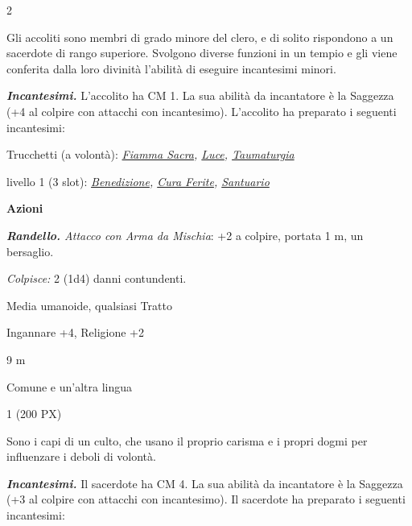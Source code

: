\begin{multicols}{2}
{Gli accoliti sono membri di grado minore del clero, e di solito rispondono a un sacerdote di rango superiore. Svolgono diverse funzioni in un tempio e gli viene conferita dalla loro divinità l'abilità di eseguire incantesimi minori.

\emph{\textbf{Incantesimi.}} L'accolito ha CM 1. La sua abilità da incantatore è la Saggezza (+4 al colpire con attacchi con incantesimo). L'accolito ha preparato i seguenti incantesimi:

Trucchetti (a volontà): \emph{\hyperlink{Fiamma Sacra}{Fiamma Sacra}, \hyperlink{Luce}{Luce}, \hyperlink{Taumaturgia}{Taumaturgia}}

livello 1 (3 slot): \emph{\hyperlink{Benedizione}{Benedizione}, \hyperlink{Cura Ferite}{Cura Ferite}, \hyperlink{Santuario}{Santuario}}

\medskip\textbf{Azioni}

\emph{\textbf{Randello.} Attacco con Arma da Mischia}: +2 a colpire, portata 1 m, un bersaglio.

\emph{Colpisce:} 2 (1d4) danni contundenti.

\begin{description}[noitemsep, topsep=0pt, parsep=0pt, partopsep=0pt, itemsep=1pt, leftmargin=2.35cm,  labelwidth=2.2cm, itemindent=0cm, listparindent=0pt] %
\setlength{\baselineskip}{10pt}
\item[\textbf{Taglia/Tipo}] Media umanoide, qualsiasi Tratto
\item[\textbf{Caratt.}] 
\item[\textbf{Punti Ferita}] 
\item[\textbf{Comp.}] Ingannare +4, Religione +2
\item[\textbf{Tiri Salvez.}] 
\item[\textbf{Movimento}] 9 m
\item[\textbf{Linguaggi}] Comune e un'altra lingua
\item[\textbf{Sfida}] 1 (200 PX)
\end{description}
\smallskip

Sono i capi di un culto, che usano il proprio carisma e i propri dogmi per influenzare i deboli di volontà.

\emph{\textbf{Incantesimi.}} Il sacerdote ha CM 4. La sua abilità da incantatore è la Saggezza (+3 al colpire con attacchi con incantesimo). Il sacerdote ha preparato i seguenti incantesimi:

}
\end{multicols}
